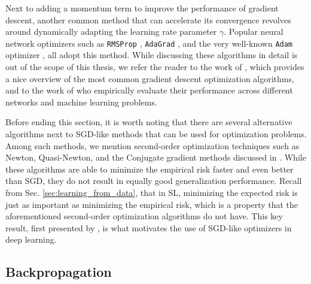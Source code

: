 Next to adding a momentum term to improve the performance of gradient descent, another common method that can accelerate its convergence revolves around dynamically adapting the learning rate parameter $\gamma$. Popular neural network optimizers such as \texttt{RMSProp} \cite{tieleman2012lecture}, \texttt{AdaGrad} \cite{duchi2011adaptive}, and the very well-known \texttt{Adam} optimizer \cite{kingma2014adam}, all adopt this method. While discussing these algorithms in detail is out of the scope of this thesis, we refer the reader to the work of \citet{ruder2016overview}, which provides a nice overview of the most common gradient descent optimization algorithms, and to the work of \citet{schmidt2020descending} who empirically evaluate their performance across different networks and machine learning problems. 

Before ending this section, it is worth noting that there are several alternative algorithms next to SGD-like methods that can be used for optimization problems. Among such methods, we mention second-order optimization techniques such as Newton, Quasi-Newton, and the Conjugate gradient methods discussed in \cite{tan2019review}. While these algorithms are able to minimize the empirical risk faster and even better than SGD, they do not result in equally good generalization performance. Recall from Sec. \ref{sec:learning_from_data}, that in SL, minimizing the expected risk is just as important as minimizing the empirical risk, which is a property that the aforementioned second-order optimization algorithms do not have. This key result, first presented by \citet{bottou201113}, is what motivates the use of SGD-like optimizers in deep learning.       

\subsection{Backpropagation}
\label{sec:backprop}

